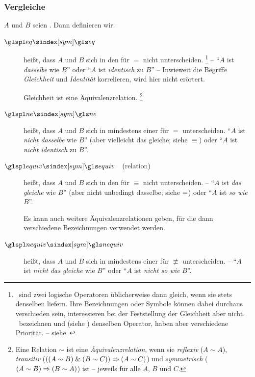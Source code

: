 \subsubsection{Vergleiche}%
\label{subsub:Vergleiche}

$A$ und $B$ seien .
Dann definieren wir:

\begin{description}
	\item[$\glsSym{eq}$~~\emph{}]\label{def:Gleichheit}
	 heißt, dass $A$ und $B$ sich in den  für $=$ nicht unterscheiden.%
	\footnote{%
		\textZB\ sind zwei logische Operatoren üblicherweise dann gleich, wenn sie stets denselben \emph{} liefern.
		Ihre Bezeichnungen oder Symbole können dabei durchaus verschieden sein, interessieren bei der Feststellung der Gleichheit aber nicht.
		\textZB\ bezeichnen \chrqt{$\metaandsym$} und \chrqt{$\srand$} (siehe ) denselben Operator, haben aber verschiedene Priorität. -- siehe~
	}
	-- \enquote{$A$ ist \emph{dasselbe} wie $B$} oder \enquote{$A$ ist \emph{identisch} zu $B$}
	-- Inwieweit die Begriffe \emph{Gleichheit} und \emph{Identität} korrelieren, wird hier nicht erörtert.

	Gleichheit ist eine Äquivalenzrelation.%
	\footnote{%
		Eine Relation $\sim$ ist eine \emph{Äquivalenzrelation}, wenn sie \emph{reflexiv} ($A \sim A$), \emph{transitiv} ($((A \sim B) \;\&\; (B \sim C)) \Rightarrow (A \sim C)$) und \emph{symmetrisch} ($(A \sim B) \Rightarrow (B \sim A)$) ist -- jeweils für alle $A$, $B$ und $C$.
	}
	\item[$\glsSym{ne}$~~\emph{}]\label{def:Ungleichheit}
	 heißt, dass $A$ und $B$ sich in mindestens einer  für $=$ unterscheiden. \enquote{$A$ ist \emph{nicht dasselbe} wie $B$} (aber vielleicht das gleiche; siehe $\equiv$) oder \enquote{$A$ ist \emph{nicht identisch} zu $B$}.
	\item[$\glsSym{equiv}$~~\emph{}(relation)]\label{def:Äquivalenz}
	 heißt, dass $A$ und $B$ sich in den  für $\equiv$ nicht unterscheiden.
	-- \enquote{$A$ ist \emph{das gleiche} wie $B$} (aber nicht unbedingt dasselbe; siehe $=$) oder \enquote{$A$ ist \emph{so wie} $B$}.

	Es kann auch weitere Äquivalenzrelationen geben, für die dann verschiedene Bezeichnungen verwendet werden.
	\item[$\glsSym{nequiv}$~~\emph{}]\label{def:Kontravalenz}
	 heißt, dass $A$ und $B$ sich in mindestens einer  für $\nequiv$ unterscheiden.
	-- \enquote{$A$ ist \emph{nicht das gleiche} wie $B$} oder \enquote{$A$ ist \emph{nicht so wie} $B$}.
\end{description}

